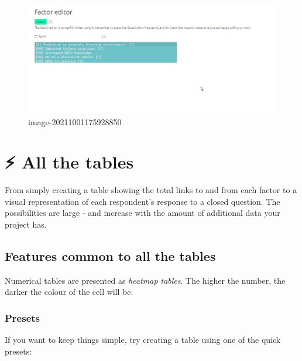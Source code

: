 \documentclass[
]{book}
\begin{document}
\begin{figure}
\centering
\includegraphics{_assets/fe sidebar.gif}
\caption{image-20211001175928850}
\end{figure}

\hypertarget{xall-tables}{%
\chapter{⚡ All the tables}\label{xall-tables}}

From simply creating a table showing the total links to and from each factor to a visual representation of each respondent's response to a closed question. The possibilities are large - and increase with the amount of additional data your project has.

\hypertarget{tables_common}{%
\section{Features common to all the tables}\label{tables_common}}

Numerical tables are presented as \emph{heatmap tables}. The higher the number, the darker the colour of the cell will be.

\hypertarget{preset-tables}{%
\subsection{Presets}\label{preset-tables}}

If you want to keep things simple, try creating a table using one of the quick presets:
\end{document}
